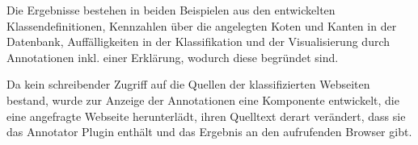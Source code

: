    Die Ergebnisse bestehen in beiden Beispielen aus
    den entwickelten Klassendefinitionen,
    Kennzahlen über die angelegten Koten und Kanten in der Datenbank,
    Auffälligkeiten in der Klassifikation und der Visualisierung durch Annotationen
    inkl. einer Erklärung, wodurch diese begründet sind.

    Da kein schreibender Zugriff auf die Quellen der klassifizierten Webseiten bestand,
    wurde zur Anzeige der Annotationen eine Komponente entwickelt,
    die eine angefragte Webseite herunterlädt,
    ihren Quelltext derart verändert,
    dass sie das Annotator Plugin enthält
    und das Ergebnis an den aufrufenden Browser gibt.